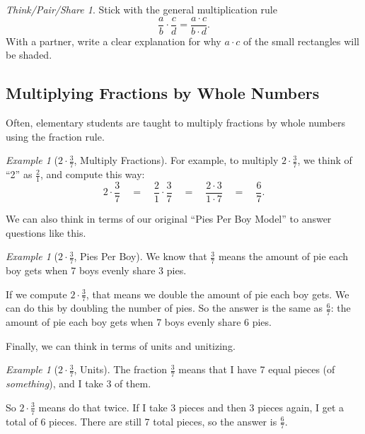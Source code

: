 \documentclass[10pt, reqno]{amsart}
\theoremstyle{remark}
\newtheorem{example}[thm]{Example}
\newtheorem*{thinkpair*}{Think/Pair/Share}
\theoremstyle{definition}
\numberwithin{equation}{section}  %
\begin{document}
\begin{thinkpair*}
Stick with the general multiplication rule
\[
\frac a b \cdot \frac cd = \frac{a\cdot c}{b\cdot d}.
\]
With a partner, write a clear explanation for why $a\cdot c$ of the small rectangles will be shaded.

\end{thinkpair*}







\subsection{Multiplying Fractions by Whole Numbers}
Often, elementary students are taught to multiply fractions by whole numbers using the fraction rule.

\begin{example}[$2 \cdot \frac 3 7$, Multiply Fractions]
For example, to multiply  $2 \cdot \frac 3 7$, we think of ``2'' as $\frac 2 1$, and compute this way:
\[
2 \cdot \frac 37 
\quad
= 
\quad
\frac 21 \cdot \frac 37 
\quad
= 
\quad
\frac{2\cdot3}{1\cdot7}
\quad
 = 
 \quad
 \frac 67.
\]
\end{example}


We can also think in terms of our original ``Pies Per Boy Model'' to answer questions like this.

\begin{example}[$2 \cdot \frac 3 7$, Pies Per Boy]
We know that $\frac 3 7$ means the amount of pie each boy gets when 7 boys evenly share 3 pies.

If we compute $2\cdot \frac 37$, that means we double the amount of pie each boy gets.  We can do this by doubling the number of pies.  So the answer is the same as $\frac 67$: the amount of pie each boy gets when 7 boys evenly share 6 pies.
\end{example}


Finally, we can think in terms of units and unitizing.

\begin{example}[$2 \cdot \frac 3 7$, Units]
The fraction $\frac 3 7$ means that I have 7 equal pieces (of \emph{something}), and I take 3 of them.

So $2\cdot \frac 37$ means do that twice.  If I take 3 pieces and then 3 pieces again, I get a total of 6 pieces.  There are still 7 total pieces, so the answer is $\frac 6 7$.

\end{example}
\end{document}
